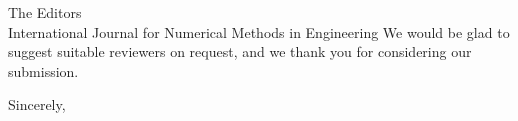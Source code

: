 \documentclass[11pt]{letter}
\begin{document}
\begin{letter}{The Editors\\International Journal for Numerical Methods in Engineering}
We would be glad to suggest suitable reviewers on request, and we thank you for
considering our submission.

\closing{Sincerely,}

\end{letter}
\end{document}
